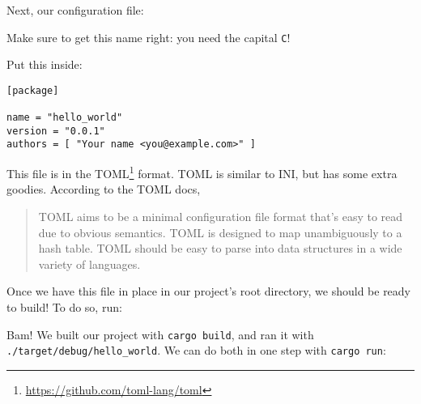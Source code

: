\documentclass[a4paper,]{book}
\newenvironment{Shaded}{\begin{snugshade}}{\end{snugshade}}
\newcommand{\KeywordTok}[1]{\textcolor[rgb]{0.13,0.29,0.53}{\textbf{{#1}}}}
\newcommand{\NormalTok}[1]{{#1}}
\renewcommand{\href}[2]{#2\footnote{\url{#1}}}
\begin{document}
Next, our configuration file:

\begin{Shaded}
\end{Shaded}

Make sure to get this name right: you need the capital \texttt{C}!

Put this inside:

\begin{verbatim}
[package]

name = "hello_world"
version = "0.0.1"
authors = [ "Your name <you@example.com>" ]
\end{verbatim}

This file is in the \href{https://github.com/toml-lang/toml}{TOML}
format. TOML is similar to INI, but has some extra goodies. According to
the TOML docs,

\begin{quote}
TOML aims to be a minimal configuration file format that's easy to read
due to obvious semantics. TOML is designed to map unambiguously to a
hash table. TOML should be easy to parse into data structures in a wide
variety of languages.
\end{quote}

Once we have this file in place in our project's root directory, we
should be ready to build! To do so, run:

\begin{Shaded}
\end{Shaded}

Bam! We built our project with \texttt{cargo\ build}, and ran it with
\texttt{./target/debug/hello\_world}. We can do both in one step with
\texttt{cargo\ run}:

\begin{Shaded}
\end{Shaded}
\end{document}
